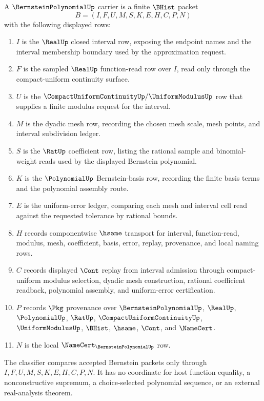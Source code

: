 \begin{definition}
\label{def:bernstein-polynomial-carrier}
A $\BernsteinPolynomialUp$ carrier is a finite $\BHist$ packet
$$
B=(I,F,U,M,S,K,E,H,C,P,N)
$$
with the following displayed rows:
\begin{enumerate}
\item $I$ is the $\RealUp$ closed interval row, exposing the endpoint names and the interval membership boundary used by the approximation request.
\item $F$ is the sampled $\RealUp$ function-read row over $I$, read only through the compact-uniform continuity surface.
\item $U$ is the $\CompactUniformContinuityUp/\UniformModulusUp$ row that supplies a finite modulus request for the interval.
\item $M$ is the dyadic mesh row, recording the chosen mesh scale, mesh points, and interval subdivision ledger.
\item $S$ is the $\RatUp$ coefficient row, listing the rational sample and binomial-weight reads used by the displayed Bernstein polynomial.
\item $K$ is the $\PolynomialUp$ Bernstein-basis row, recording the finite basis terms and the polynomial assembly route.
\item $E$ is the uniform-error ledger, comparing each mesh and interval cell read against the requested tolerance by rational bounds.
\item $H$ records componentwise $\hsame$ transport for interval, function-read, modulus, mesh, coefficient, basis, error, replay, provenance, and local naming rows.
\item $C$ records displayed $\Cont$ replay from interval admission through compact-uniform modulus selection, dyadic mesh construction, rational coefficient readback, polynomial assembly, and uniform-error certification.
\item $P$ records $\Pkg$ provenance over $\BernsteinPolynomialUp$, $\RealUp$, $\PolynomialUp$, $\RatUp$, $\CompactUniformContinuityUp$, $\UniformModulusUp$, $\BHist$, $\hsame$, $\Cont$, and $\NameCert$.
\item $N$ is the local $\NameCert_{\BernsteinPolynomialUp}$ row.
\end{enumerate}
The classifier compares accepted Bernstein packets only through $I,F,U,M,S,K,E,H,C,P,N$. It has no coordinate for host function equality, a nonconstructive supremum, a choice-selected polynomial sequence, or an external real-analysis theorem.
\end{definition}

